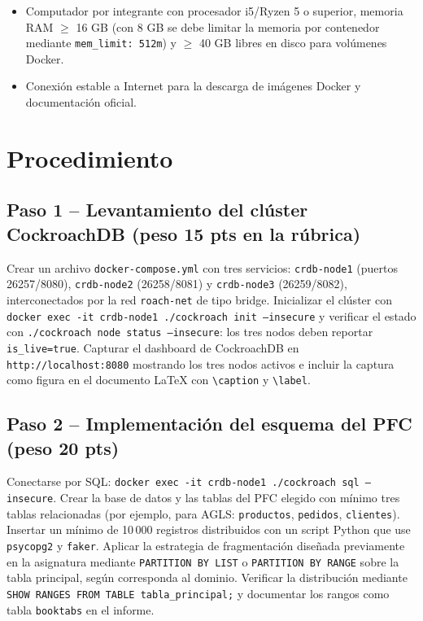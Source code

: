 \documentclass[11pt,a4paper]{article}
\begin{document}
\begin{itemize}[nosep,leftmargin=1.6em]
    \item Computador por integrante con procesador i5/Ryzen 5 o superior, memoria RAM $\geq$ 16 GB (con 8 GB se debe limitar la memoria por contenedor mediante \texttt{mem\_limit: 512m}) y $\geq$ 40 GB libres en disco para vol\'umenes Docker.
    \item Conexi\'on estable a Internet para la descarga de im\'agenes Docker y documentaci\'on oficial.
\end{itemize}

\section{Procedimiento}

\subsection*{Paso 1 -- Levantamiento del cl\'uster CockroachDB (peso 15 pts en la r\'ubrica)}

{\sloppy
Crear un archivo \texttt{docker-compose.yml} con tres servicios: \texttt{crdb-node1} (puertos 26257/8080), \texttt{crdb-node2} (26258/8081) y \texttt{crdb-node3} (26259/8082), interconectados por la red \texttt{roach-net} de tipo bridge. Inicializar el cl\'uster con \texttt{docker exec -it crdb-node1 ./cockroach init --insecure} y verificar el estado con \texttt{./cockroach node status --insecure}: los tres nodos deben reportar \texttt{is\_live=true}. Capturar el dashboard de CockroachDB en \texttt{http://localhost:8080} mostrando los tres nodos activos e incluir la captura como figura en el documento LaTeX con \texttt{\textbackslash caption} y \texttt{\textbackslash label}.
\par}

\subsection*{Paso 2 -- Implementaci\'on del esquema del PFC (peso 20 pts)}

Conectarse por SQL: \texttt{docker exec -it crdb-node1 ./cockroach sql --insecure}. Crear la base de datos y las tablas del PFC elegido con m\'inimo tres tablas relacionadas (por ejemplo, para AGLS: \texttt{productos}, \texttt{pedidos}, \texttt{clientes}). Insertar un m\'inimo de 10\,000 registros distribuidos con un script Python que use \texttt{psycopg2} y \texttt{faker}. Aplicar la estrategia de fragmentaci\'on dise\~nada previamente en la asignatura mediante \texttt{PARTITION BY LIST} o \texttt{PARTITION BY RANGE} sobre la tabla principal, seg\'un corresponda al dominio. Verificar la distribuci\'on mediante \texttt{SHOW RANGES FROM TABLE tabla\_principal;} y documentar los rangos como tabla \texttt{booktabs} en el informe.
\end{document}
